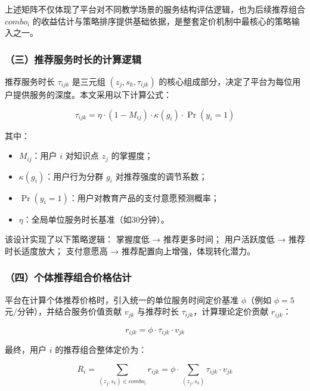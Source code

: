 \vspace{0.5em}
上述矩阵不仅体现了平台对不同教学场景的服务结构评估逻辑，也为后续推荐组合 $combo_i$ 的收益估计与策略排序提供基础依据，是整套定价机制中最核心的策略输入之一。



\subsubsection*{（三）推荐服务时长的计算逻辑}

推荐服务时长 $\tau_{ijk}$ 是三元组 $(z_j, s_k, \tau_{ijk})$ 的核心组成部分，决定了平台为每位用户提供服务的深度。本文采用以下计算公式：

\begin{equation}
\tau_{ijk} = \eta \cdot (1 - M_{ij}) \cdot \kappa(g_i) \cdot \Pr(y_i = 1)
\end{equation}

其中：

\begin{itemize}
\item $M_{ij}$：用户 $i$ 对知识点 $z_j$ 的掌握度；
\item $\kappa(g_i)$：用户行为分群 $g_i$ 对推荐强度的调节系数；
\item $\Pr(y_i = 1)$：用户对教育产品的支付意愿预测概率；
\item $\eta$：全局单位服务时长基准（如30分钟）。
\end{itemize}

该设计实现了以下策略逻辑：
掌握度低 → 推荐更多时间；
用户活跃度低 → 推荐时长适度放大；
支付意愿高 → 推荐配置向上增强，体现转化潜力。

\subsubsection*{（四）个体推荐组合价格估计}

平台在计算个体推荐价格时，引入统一的单位服务时间定价基准 $\phi$（例如 $\phi = 5$ 元/分钟），并结合服务价值贡献 $v_{jk}$ 与推荐时长 $\tau_{ijk}$，计算理论定价贡献 $r_{ijk}$：

\begin{equation}
r_{ijk} = \phi \cdot \tau_{ijk} \cdot v_{jk}
\end{equation}

最终，用户 $i$ 的推荐组合整体定价为：

\begin{equation}
R_i = \sum_{(z_j, s_k) \in combo_i} r_{ijk} = \phi \cdot \sum_{(z_j, s_k)} \tau_{ijk} \cdot v_{jk}
\end{equation}

